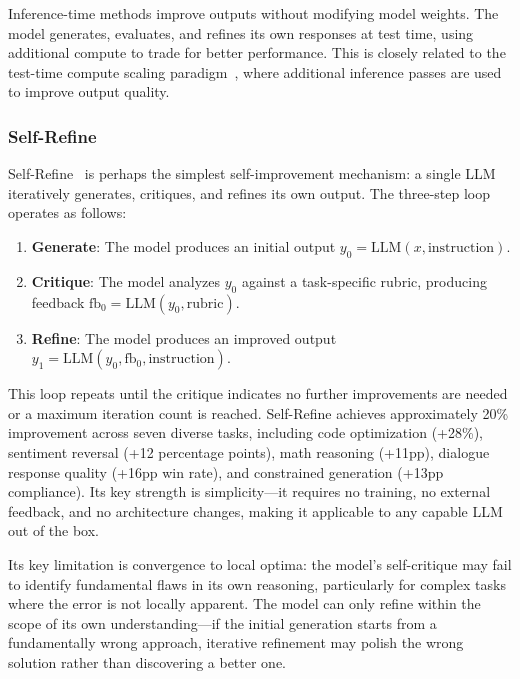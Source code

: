 \documentclass[11pt,a4paper]{article}
\begin{document}
Inference-time methods improve outputs without modifying model weights. The model generates, evaluates, and refines its own responses at test time, using additional compute to trade for better performance. This is closely related to the test-time compute scaling paradigm~\citep{snell2024rise}, where additional inference passes are used to improve output quality.

\subsubsection{Self-Refine}

Self-Refine~\citep{madaan2023selfrefine} is perhaps the simplest self-improvement mechanism: a single LLM iteratively generates, critiques, and refines its own output. The three-step loop operates as follows:

\begin{enumerate}
\item \textbf{Generate}: The model produces an initial output $y_0 = \text{LLM}(x, \text{instruction})$.
\item \textbf{Critique}: The model analyzes $y_0$ against a task-specific rubric, producing feedback $\text{fb}_0 = \text{LLM}(y_0, \text{rubric})$.
\item \textbf{Refine}: The model produces an improved output $y_1 = \text{LLM}(y_0, \text{fb}_0, \text{instruction})$.
\end{enumerate}

This loop repeats until the critique indicates no further improvements are needed or a maximum iteration count is reached. Self-Refine achieves approximately 20\% improvement across seven diverse tasks, including code optimization (+28\%), sentiment reversal (+12 percentage points), math reasoning (+11pp), dialogue response quality (+16pp win rate), and constrained generation (+13pp compliance). Its key strength is simplicity---it requires no training, no external feedback, and no architecture changes, making it applicable to any capable LLM out of the box.

Its key limitation is convergence to local optima: the model's self-critique may fail to identify fundamental flaws in its own reasoning, particularly for complex tasks where the error is not locally apparent. The model can only refine within the scope of its own understanding---if the initial generation starts from a fundamentally wrong approach, iterative refinement may polish the wrong solution rather than discovering a better one.
\end{document}
